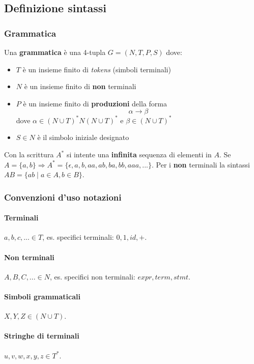 \subsection{Definizione sintassi}
\label{sec:definizione_sintassi}
\subsubsection{Grammatica}
\label{sec:grammatica}
\begin{definition}
Una \textbf{grammatica} è una 4-tupla $G = (N,T,P,S)$ dove:
\begin{itemize}
\item $T$ è un insieme finito di \textit{tokens} (simboli terminali)
\item $N$ è un insieme finito di \textbf{non} terminali
\item $P$ è un insieme finito di \textbf{produzioni} della forma
$$\alpha \longrightarrow \beta$$ dove $\alpha \in (N \cup T)^*N(N \cup T)^*$ e
$\beta \in (N \cup T)^*$
\item $S \in N$ è il simbolo iniziale designato
\end{itemize}
\label{def:grammatica}
\end{definition}

Con la scrittura $A^*$ si intente una \textbf{infinita} sequenza di elementi in
$A$. Se $A=\{a,b\} \Rightarrow A^*=\{\epsilon,a,b,aa,ab,ba,bb,aaa,...\}$. Per i
\textbf{non} terminali la sintassi $AB=\{ab \mid a \in A,b \in B\}$.

\subsubsection{Convenzioni d'uso notazioni}
\label{sec:convenzioni_notazioni}
\paragraph{Terminali}
$a,b,c,... \in T$, es. specifici terminali: $0,1,id,+$.
\paragraph{Non terminali}
$A,B,C,... \in N$, es. specifici non terminali: $expr, term, stmt$.
\paragraph{Simboli grammaticali}
$X,Y,Z \in (N{\cup}T)$.
\paragraph{Stringhe di terminali}
$u,v,w,x,y,z \in T^*$.
